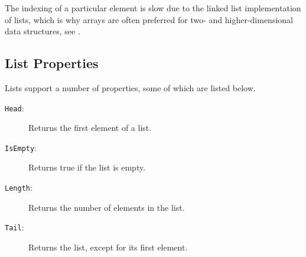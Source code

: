\documentclass[fsharpnotes.tex]{subfiles}
\begin{document}
 The indexing of a particular element is slow due to the linked list implementation of lists, which is why arrays are often preferred for two- and higher-dimensional data structures, see .

\subsection{List Properties}
Lists support a number of properties, some of which are listed below.
\begin{description}
\item[\texttt{Head}:] Returns the first element of a list.
\item[\texttt{IsEmpty}:] Returns true if the list is empty.
\item[\texttt{Length}:] Returns the number of elements in the list.
\item[\texttt{Tail}:] Returns the list, except for its first element.
\end{description}
\end{document}
